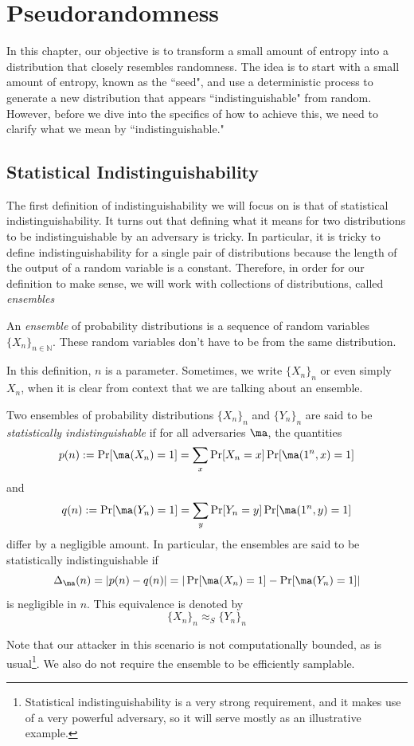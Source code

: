 
\chapter{Pseudorandomness}
In this chapter, our objective is to transform a small amount of entropy into a distribution that closely resembles randomness.
The idea is to start with a small amount of entropy, known as the ``seed", and use a deterministic process to generate a new distribution that appears ``indistinguishable" from random. 
However, before we dive into the specifics of how to achieve this, we need to clarify what we mean by ``indistinguishable."

\section{Statistical Indistinguishability}
The first definition of indistinguishability we will focus on is that of statistical indistinguishability.
It turns out that defining what it means for two distributions to be indistinguishable by an adversary is tricky.
In particular, it is tricky to define indistinguishability for a single pair of distributions because the length of the output of a random variable is a constant.
Therefore, in order for our definition to make sense, we will work with collections of distributions, called \emph{ensembles}
\begin{definition}
An \emph{ensemble} of probability distributions is a sequence of random variables $\{X_n\}_{n\in \mathbb{N}}$. 
These random variables don't have to be from the same distribution.
\end{definition}
In this definition, $n$ is a parameter.
Sometimes, we write $\{X_n\}_n$ or even simply $X_n$, when it is clear from context that we are talking about an ensemble.

\begin{definition}
    Two ensembles of probability distributions $\{X_n\}_n$ and $\{Y_n\}_n$ are said to be \emph{statistically indistinguishable} if for all adversaries $\ma$, the quantities
    $$p(n) := \Pr[\ma(X_n) = 1] = \sum_x \Pr[X_n = x]\Pr[\ma(1^n,x) = 1]$$
    and
    $$q(n) := \Pr[\ma(Y_n) = 1] = \sum_y \Pr[Y_n = y]\Pr[\ma(1^n,y) = 1]$$
    differ by a negligible amount.
    In particular, the ensembles are said to be statistically indistinguishable if
    $$\Delta_\ma(n) = |p(n) - q(n)| = |\Pr[\ma(X_n) = 1] - \Pr[\ma(Y_n) = 1]|$$
    is negligible in $n$.
This equivalence is denoted by
$$\{X_n\}_n \approx_S \{Y_n\}_n$$
\end{definition}
Note that our attacker in this scenario is not computationally bounded, as is usual\footnote{Statistical indistinguishability is a very strong requirement, and it makes use of a very powerful adversary, so it will serve mostly as an illustrative example.}.
We also do not require the ensemble to be efficiently samplable.

